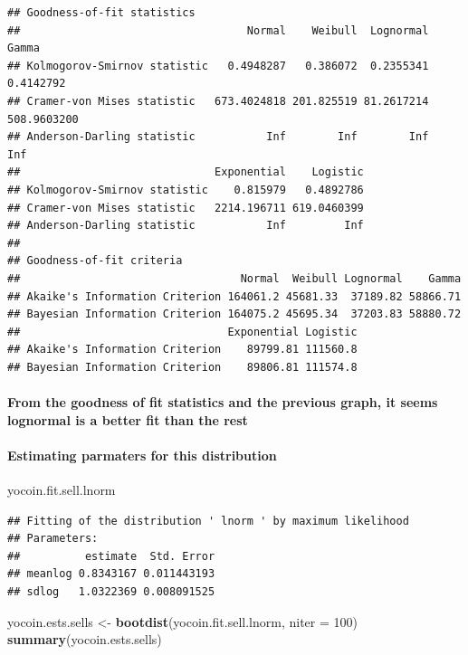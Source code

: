 \documentclass[]{article}
\newenvironment{Shaded}{\begin{snugshade}}{\end{snugshade}}
\newcommand{\KeywordTok}[1]{\textcolor[rgb]{0.13,0.29,0.53}{\textbf{#1}}}
\newcommand{\DataTypeTok}[1]{\textcolor[rgb]{0.13,0.29,0.53}{#1}}
\newcommand{\DecValTok}[1]{\textcolor[rgb]{0.00,0.00,0.81}{#1}}
\newcommand{\StringTok}[1]{\textcolor[rgb]{0.31,0.60,0.02}{#1}}
\newcommand{\NormalTok}[1]{#1}
\let\oldparagraph\paragraph
\renewcommand{\paragraph}[1]{\oldparagraph{#1}\mbox{}}
\begin{document}
\begin{verbatim}
## Goodness-of-fit statistics
##                                   Normal    Weibull  Lognormal       Gamma
## Kolmogorov-Smirnov statistic   0.4948287   0.386072  0.2355341   0.4142792
## Cramer-von Mises statistic   673.4024818 201.825519 81.2617214 508.9603200
## Anderson-Darling statistic           Inf        Inf        Inf         Inf
##                              Exponential    Logistic
## Kolmogorov-Smirnov statistic    0.815979   0.4892786
## Cramer-von Mises statistic   2214.196711 619.0460399
## Anderson-Darling statistic           Inf         Inf
## 
## Goodness-of-fit criteria
##                                  Normal  Weibull Lognormal    Gamma
## Akaike's Information Criterion 164061.2 45681.33  37189.82 58866.71
## Bayesian Information Criterion 164075.2 45695.34  37203.83 58880.72
##                                Exponential Logistic
## Akaike's Information Criterion    89799.81 111560.8
## Bayesian Information Criterion    89806.81 111574.8
\end{verbatim}

\paragraph{From the goodness of fit statistics and the previous graph,
it seems lognormal is a better fit than the
rest}\label{from-the-goodness-of-fit-statistics-and-the-previous-graph-it-seems-lognormal-is-a-better-fit-than-the-rest-1}

\paragraph{Estimating parmaters for this
distribution}\label{estimating-parmaters-for-this-distribution-3}

\begin{Shaded}
\begin{Highlighting}[]
\NormalTok{yocoin.fit.sell.lnorm}
\end{Highlighting}
\end{Shaded}

\begin{verbatim}
## Fitting of the distribution ' lnorm ' by maximum likelihood 
## Parameters:
##          estimate  Std. Error
## meanlog 0.8343167 0.011443193
## sdlog   1.0322369 0.008091525
\end{verbatim}

\begin{Shaded}
\begin{Highlighting}[]
\NormalTok{yocoin.ests.sells <-}\StringTok{ }\KeywordTok{bootdist}\NormalTok{(yocoin.fit.sell.lnorm, }\DataTypeTok{niter =} \DecValTok{100}\NormalTok{)}
\KeywordTok{summary}\NormalTok{(yocoin.ests.sells)}
\end{Highlighting}
\end{Shaded}
\end{document}
